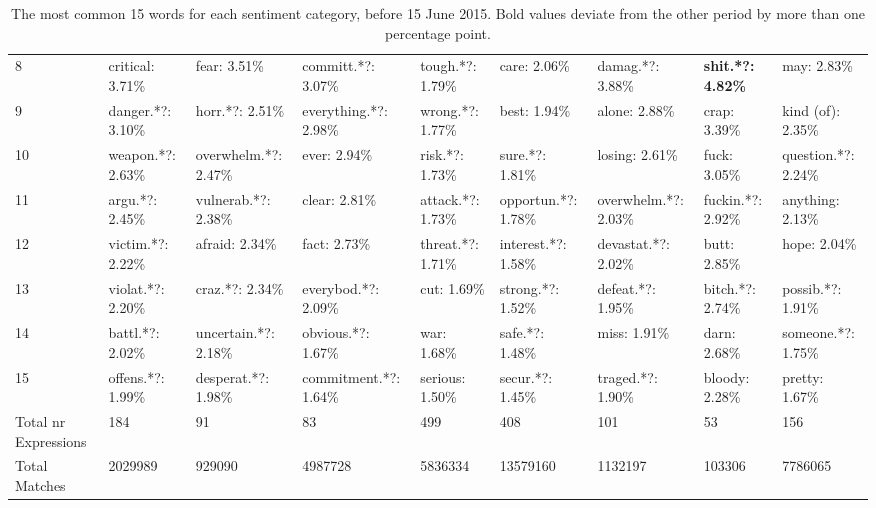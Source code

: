 \begin{table}[h]
\begin{adjustbox}{width=\linewidth, center}
\begin{tabular}{lllllllll}
	8                    &           critical: 3.71\% &          fear: 3.51\% &     committ.*?: 3.07\% &      tough.*?: 1.79\% &         care: 2.06\% &       damag.*?: 3.88\% &  \textbf{shit.*?: 4.82\%} &           may: 2.83\% \\
	9                    &          danger.*?: 3.10\% &       horr.*?: 2.51\% &  everything.*?: 2.98\% &      wrong.*?: 1.77\% &         best: 1.94\% &          alone: 2.88\% &              crap: 3.39\% &     kind (of): 2.35\% \\
	10                   &          weapon.*?: 2.63\% &  overwhelm.*?: 2.47\% &           ever: 2.94\% &       risk.*?: 1.73\% &      sure.*?: 1.81\% &         losing: 2.61\% &              fuck: 3.05\% &   question.*?: 2.24\% \\
	11                   &            argu.*?: 2.45\% &   vulnerab.*?: 2.38\% &          clear: 2.81\% &     attack.*?: 1.73\% &  opportun.*?: 1.78\% &   overwhelm.*?: 2.03\% &         fuckin.*?: 2.92\% &      anything: 2.13\% \\
	12                   &          victim.*?: 2.22\% &        afraid: 2.34\% &           fact: 2.73\% &     threat.*?: 1.71\% &  interest.*?: 1.58\% &    devastat.*?: 2.02\% &              butt: 2.85\% &          hope: 2.04\% \\
	13                   &          violat.*?: 2.20\% &       craz.*?: 2.34\% &    everybod.*?: 2.09\% &           cut: 1.69\% &    strong.*?: 1.52\% &      defeat.*?: 1.95\% &          bitch.*?: 2.74\% &     possib.*?: 1.91\% \\
	14                   &           battl.*?: 2.02\% &  uncertain.*?: 2.18\% &     obvious.*?: 1.67\% &           war: 1.68\% &      safe.*?: 1.48\% &           miss: 1.91\% &              darn: 2.68\% &    someone.*?: 1.75\% \\
	15                   &          offens.*?: 1.99\% &   desperat.*?: 1.98\% &  commitment.*?: 1.64\% &       serious: 1.50\% &     secur.*?: 1.45\% &      traged.*?: 1.90\% &            bloody: 2.28\% &        pretty: 1.67\% \\
	Total nr Expressions &                        184 &                    91 &                     83 &                   499 &                  408 &                    101 &                        53 &                   156 \\
	Total Matches        &                    2029989 &                929090 &                4987728 &               5836334 &             13579160 &                1132197 &                    103306 &               7786065 \\
	\bottomrule
	\end{tabular}
	
\end{adjustbox}
	\caption{The most common 15 words for each sentiment category, before 15 June 2015. Bold values deviate from the other period by more than one percentage point.}
	\label{fig: before_1}
\end{table}

